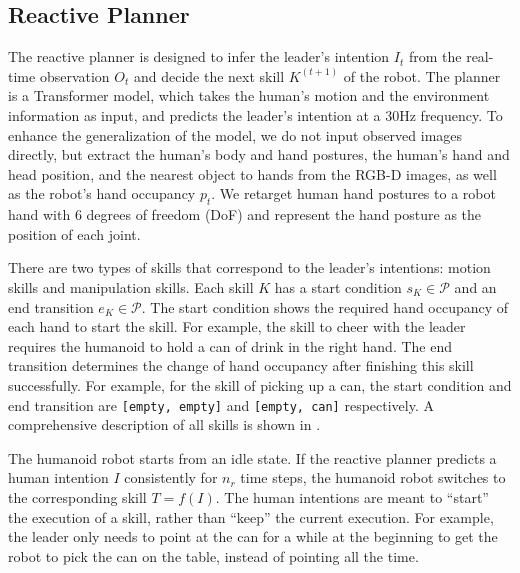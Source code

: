 \subsection{Reactive Planner}
\label{sec:reactive-planner}
The reactive planner is designed to infer the leader's intention $I_t$ from the real-time observation $O_t$ and decide the next skill $K^{(t+1)}$ of the robot.
The planner is a Transformer model, which takes the human's motion and the environment information as input, and predicts the leader's intention at a 30Hz frequency.
To enhance the generalization of the model, we do not input observed images directly, but extract the human's body and hand postures, the human's hand and head position, and the nearest object to hands from the RGB-D images, as well as the robot's hand occupancy $p_t$.
We retarget human hand postures to a robot hand with 6 degrees of freedom (DoF) and represent the hand posture as the position of each joint.

There are two types of skills that correspond to the leader's intentions: motion skills and manipulation skills. Each skill $K$ has a start condition $s_K \in \mathcal{P}$ and an end transition $e_K \in \mathcal{P}$. 
The start condition shows the required hand occupancy of each hand to start the skill. For example, the skill to cheer with the leader requires the humanoid to hold a can of drink in the right hand.
The end transition determines the change of hand occupancy after finishing this skill successfully. For example, for the skill of picking up a can, the start condition and end transition are \texttt{[empty, empty]} and \texttt{[empty, can]} respectively.
A comprehensive description of all skills is shown in .

The humanoid robot starts from an idle state. If the reactive planner predicts a human intention $I$ consistently for $n_{r}$ time steps, the humanoid robot switches to the corresponding skill $T=f(I)$.
The human intentions are meant to ``start'' the execution of a skill, rather than ``keep'' the current execution. For example, the leader only needs to point at the can for a while at the beginning to get the robot to pick the can on the table, instead of pointing all the time. 

